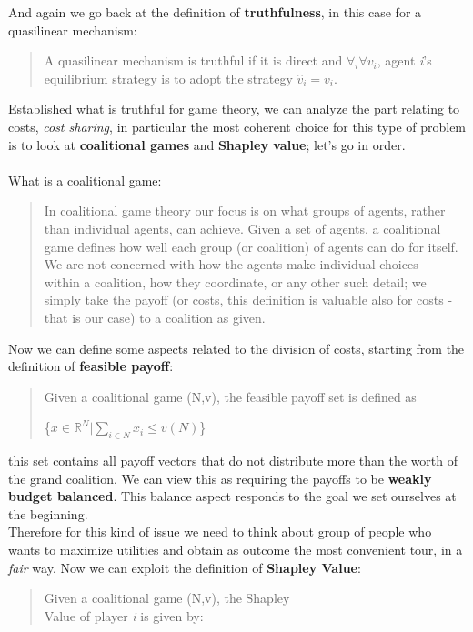 \documentclass{article}
\begin{document}
{\begin{quote}
\end{quote}
And again we go back at the definition of \textbf{truthfulness}, in this case for a quasilinear mechanism:
\begin{quote}
    A quasilinear mechanism is truthful if it is direct and $\forall _i \forall v_i$, agent \textit{i}'s equilibrium strategy is to adopt the strategy $\hat{v}_i = v_i$.
\end{quote}
Established what is truthful for game theory, we can analyze the part relating to costs, \textit{cost sharing}, in particular the most coherent choice for this type of problem is to look at  \textbf{coalitional games} and \textbf{Shapley value}; let's go in order.\\\\
What is a coalitional game:
\begin{quote}
    In coalitional game theory our focus is on what groups of agents, rather than individual agents, can achieve. Given a set of agents, a coalitional game defines how well each group (or coalition) of agents can do for itself. We are not concerned with how the agents make individual choices \\within a coalition, how they coordinate, or any other such detail; we simply take the payoff (or costs, this definition is valuable also for costs - that is our case) to a coalition as given.
\end{quote}
Now we can define some aspects related to the division of costs, starting from the definition of \textbf{feasible payoff}:
\begin{quote}
    Given a coalitional game (N,v), the feasible payoff set is defined as 
    \begin{center}
        \{$x \in \mathbb{R}^N \vert \sum_{i\in N} x_i \le v(N)$\}
    \end{center}
\end{quote}
this set contains all payoff vectors that do not distribute more than the worth of the grand coalition. We can view this as requiring the payoffs to be \textbf{weakly budget balanced}. This balance aspect responds to the goal we set ourselves at the beginning.
\\Therefore for this kind of issue we need to think about group of people who wants to maximize utilities and obtain as outcome the most convenient tour, in a \textit{fair} way. Now we can exploit the definition of \textbf{Shapley Value}:
\begin{quote}
    Given a coalitional game (N,v), the Shapley \\Value of player \textit{i} is given by:

\end{quote}}
\end{document}

